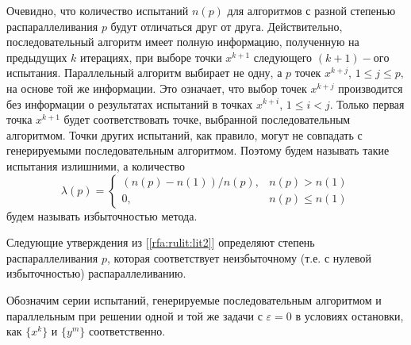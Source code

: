 \documentclass[10pt,a4paper]{book}
\begin{document}
Очевидно, что количество испытаний $n(p)$ для алгоритмов с разной степенью распараллеливания $p$ будут отличаться друг от друга. Действительно, последовательный алгоритм имеет полную информацию, полученную на предыдущих $k$ итерациях, при выборе точки $x^{k+1}$ следующего $(k+1)-ого$ испытания. Параллельный алгоритм выбирает не одну, а $p$ точек $x^{k+j}$, $1 \leq j \leq p,$ на основе той же информации. Это означает, что выбор точек $x^{k+j}$ производится без информации о результатах испытаний в точках $x^{k+i}$, $1 \leq i < j$. Только первая точка $x^{k+1}$ будет соответствовать точке, выбранной последовательным алгоритмом. Точки других испытаний, как правило, могут не совпадать с генерируемыми последовательным алгоритмом. Поэтому будем называть такие испытания излишними, а количество
\begin{displaymath}
\lambda(p) = \left\{ \begin{array}{ll}
                (n(p) - n(1)) / n(p), & \textrm{$n(p) > n(1)$}\\
                0, & \textrm{$n(p) \leq n(1)$}
  \end{array} \right.
\end{displaymath}
будем называть избыточностью метода.

Следующие утверждения из [\ref{rfa:rulit:lit2}] определяют степень распараллеливания $p$, которая соответствует неизбыточному (т.е. с нулевой избыточностью) распараллеливанию.

Обозначим серии испытаний, генерируемые последовательным алгоритмом и параллельным при решении одной и той же задачи с $\varepsilon=0$ в условиях остановки, как $\{x^k\}$ и $\{y^m \}$ соответственно.
\end{document}
